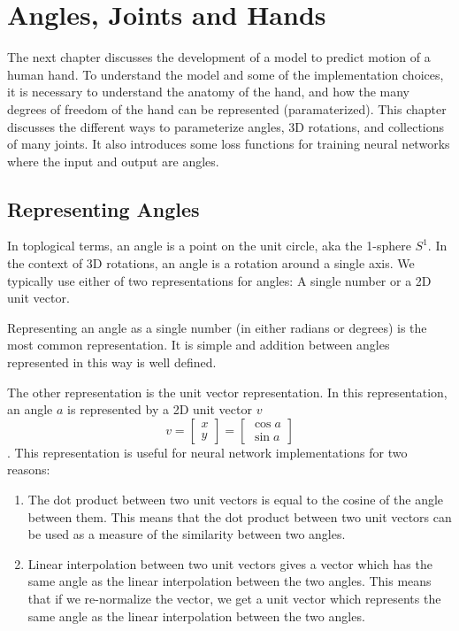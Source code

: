 \chapter{Angles, Joints and Hands}
\label{C:angles-joints-hands}

The next chapter discusses the development of a model to predict motion of a human hand. To understand the model and some of the implementation choices, it is necessary to understand the anatomy of the hand, and how the many degrees of freedom of the hand can be represented (paramaterized). This chapter discusses the different ways to parameterize angles, 3D rotations, and collections of many joints. It also introduces some loss functions for training neural networks where the input and output are angles.

\section{Representing Angles}

In toplogical terms, an angle is a point on the unit circle, aka the 1-sphere $S^1$. In the context of 3D rotations, an angle is a rotation around a single axis. We typically use either of two representations for angles: A single number or a 2D unit vector.

Representing an angle as a single number (in either radians or degrees) is the most common representation. It is simple and addition between angles represented in this way is well defined.

The other representation is the unit vector representation. In this representation, an angle $a$ is represented by a 2D unit vector $v$
\begin{equation}
    v = \begin{bmatrix}x \\ y\end{bmatrix} = \begin{bmatrix}\cos{a} \\ \sin{a}\end{bmatrix}
\end{equation}.
This representation is useful for neural network implementations for two reasons:
\begin{enumerate}
    \item The dot product between two unit vectors is equal to the cosine of the angle between them. This means that the dot product between two unit vectors can be used as a measure of the similarity between two angles.
    \item Linear interpolation between two unit vectors gives a vector which has the same angle as the linear interpolation between the two angles. This means that if we re-normalize the vector, we get a unit vector which represents the same angle as the linear interpolation between the two angles.
\end{enumerate}

